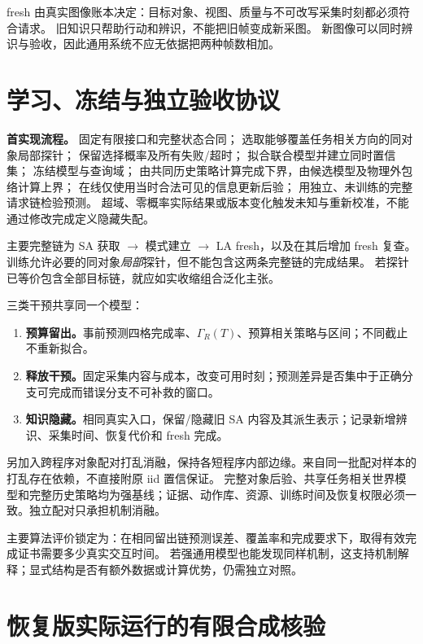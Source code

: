 \documentclass[11pt,a4paper,fontset=fandol]{ctexart}
\theoremstyle{definition}
\theoremstyle{remark}
\numberwithin{equation}{section}
\begin{document}
fresh 由真实图像账本决定：目标对象、视图、质量与不可改写采集时刻都必须符合请求。
旧知识只帮助行动和辨识，不能把旧帧变成新采图。
新图像可以同时辨识与验收，因此通用系统不应无依据把两种帧数相加。

\section{学习、冻结与独立验收协议}
\label{sec:learning}
\begin{corebox}
\textbf{首实现流程。}
固定有限接口和完整状态合同；
选取能够覆盖任务相关方向的同对象局部探针；
保留选择概率及所有失败/超时；
拟合联合模型并建立同时置信集；
冻结模型与查询域；
由共同历史策略计算完成下界，由候选模型及物理外包络计算上界；
在线仅使用当时合法可见的信息更新后验；
用独立、未训练的完整请求链检验预测。
超域、零概率实际结果或版本变化触发未知与重新校准，不能通过修改完成定义隐藏失配。
\end{corebox}

主要完整链为 SA 获取 $\to$ 模式建立 $\to$ LA fresh，以及在其后增加 fresh 复查。
训练允许必要的同对象\emph{局部}探针，但不能包含这两条完整链的完成结果。
若探针已等价包含全部目标链，就应如实收缩组合泛化主张。

三类干预共享同一个模型：
\begin{enumerate}
\item \textbf{预算留出。}事前预测四格完成率、$\Gamma_R(T)$、预算相关策略与区间；不同截止不重新拟合。
\item \textbf{释放干预。}固定采集内容与成本，改变可用时刻；预测差异是否集中于正确分支可完成而错误分支不可补救的窗口。
\item \textbf{知识隐藏。}相同真实入口，保留/隐藏旧 SA 内容及其派生表示；记录新增辨识、采集时间、恢复代价和 fresh 完成。
\end{enumerate}

另加入跨程序对象配对打乱消融，保持各短程序内部边缘。来自同一批配对样本的打乱存在依赖，不直接附原 iid 置信保证。
完整对象后验、共享任务相关世界模型和完整历史策略均为强基线；证据、动作库、资源、训练时间及恢复权限必须一致。独立配对只承担机制消融。

主要算法评价锁定为：在相同留出链预测误差、覆盖率和完成要求下，取得有效完成证书需要多少真实交互时间。
若强通用模型也能发现同样机制，这支持机制解释；显式结构是否有额外数据或计算优势，仍需独立对照。

\section{恢复版实际运行的有限合成核验}
\label{sec:results}
\end{document}

